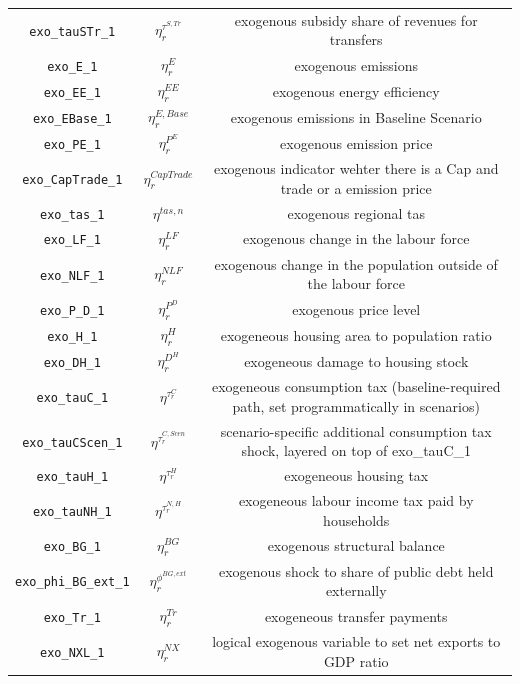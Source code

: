 \begin{center}
\begin{longtable}{ccc}
\texttt{exo\_tauSTr\_1} & ${\eta^{\tau^{S,Tr}}_r}$ & exogenous subsidy share of revenues for transfers\\
\texttt{exo\_E\_1} & ${\eta^{E}_r}$ & exogenous emissions\\
\texttt{exo\_EE\_1} & ${\eta^{EE}_r}$ & exogenous energy efficiency\\
\texttt{exo\_EBase\_1} & ${\eta^{E,Base}_r}$ & exogenous emissions in Baseline Scenario\\
\texttt{exo\_PE\_1} & ${\eta^{P^E}_r}$ & exogenous emission price\\
\texttt{exo\_CapTrade\_1} & ${\eta^{CapTrade}_r}$ & exogenous indicator wehter there is a Cap and trade or a emission price\\
\texttt{exo\_tas\_1} & ${\eta^{tas,n}}$ & exogenous regional tas\\
\texttt{exo\_LF\_1} & ${\eta^{LF}_{r}}$ & exogenous change in the labour force\\
\texttt{exo\_NLF\_1} & ${\eta^{NLF}_{r}}$ & exogenous change in the population outside of the labour force\\
\texttt{exo\_P\_D\_1} & ${\eta^{P^D}_{r}}$ & exogenous price level\\
\texttt{exo\_H\_1} & ${\eta^{H}_r}$ & exogeneous housing area to population ratio\\
\texttt{exo\_DH\_1} & ${\eta^{D^{H}}_r}$ & exogeneous damage to housing stock\\
\texttt{exo\_tauC\_1} & ${\eta^{\tau^C_{r}}}$ & exogeneous consumption tax (baseline-required path, set programmatically in scenarios)\\
\texttt{exo\_tauCScen\_1} & ${\eta^{\tau^{C,Scen}_{r}}}$ & scenario-specific additional consumption tax shock, layered on top of exo\_tauC\_1\\
\texttt{exo\_tauH\_1} & ${\eta^{\tau^H_{r}}}$ & exogeneous housing tax\\
\texttt{exo\_tauNH\_1} & ${\eta^{\tau^{N,H}_{r}}}$ & exogeneous labour income tax paid by households\\
\texttt{exo\_BG\_1} & ${\eta^{BG}_{r}}$ & exogenous structural balance\\
\texttt{exo\_phi\_BG\_ext\_1} & ${\eta^{\phi^{BG,ext}}_{r}}$ & exogenous shock to share of public debt held externally\\
\texttt{exo\_Tr\_1} & ${\eta^{Tr}_r}$ & exogeneous transfer payments\\
\texttt{exo\_NXL\_1} & ${\eta^{NX}_r}$ & logical exogenous variable to set net exports to GDP ratio\\

\end{longtable}
\end{center}
